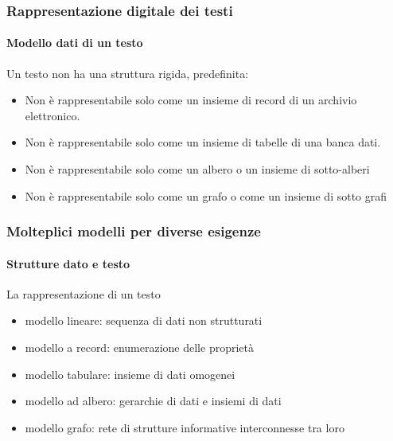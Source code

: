 \begin{frame}
	\frametitle{Rappresentazione digitale dei testi}
	\framesubtitle{Modello dati di un testo}
	\addtocounter{nframe}{1}

	\begin{block}{Un testo non ha una struttura rigida, predefinita: }
		\begin{itemize}

			\item Non è rappresentabile solo come un insieme di record di un archivio elettronico.
			\item Non è rappresentabile solo come un insieme di tabelle di una banca dati.
			\item Non è rappresentabile solo come un albero o un insieme di sotto-alberi
			\item Non è rappresentabile solo come un grafo o come un insieme di sotto grafi

		\end{itemize}

	\end{block}

\end{frame}

\begin{frame}
	\frametitle{Molteplici modelli per diverse esigenze}
	\framesubtitle{Strutture dato e testo}
	\addtocounter{nframe}{1}

	\begin{block}{La rappresentazione di un testo}
		\begin{itemize}
			\item modello lineare: sequenza di dati non strutturati
			\item modello  a record: enumerazione delle proprietà
			\item modello tabulare: insieme di dati omogenei
			\item modello ad albero: gerarchie di dati e insiemi di dati
			\item modello grafo: rete di strutture informative interconnesse tra loro
        \end{itemize}
        
	\end{block}
\end{frame}



